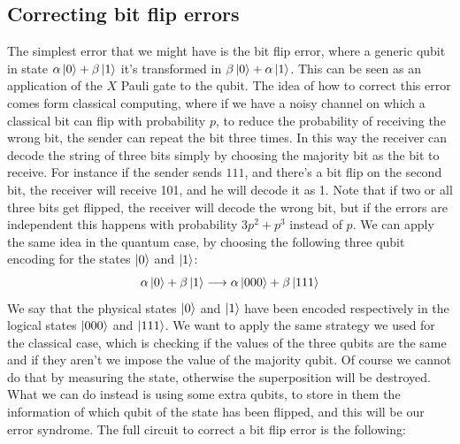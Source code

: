 \documentclass{article}
\begin{document}
	\subsection{Correcting bit flip errors}
	The simplest error that we might have is the bit flip error, where a generic qubit in state $\alpha\ket{0} + \beta\ket{1}$ it's transformed in $\beta\ket{0} + \alpha\ket{1}$. This can be seen as an application of the $X$ Pauli gate to the qubit. The idea of how to correct this error comes form classical computing, where if we have a noisy channel on which a classical bit can flip with probability $p$, to reduce the probability of receiving the wrong bit, the sender can repeat the bit three times. In this way the receiver can decode the string of three bits simply by choosing the majority bit as the bit to receive. For instance if the sender sends $111$, and there's a bit flip on the second bit, the receiver will receive 101, and he will decode it as 1. Note that if two or all three bits get flipped, the receiver will decode the wrong bit, but if the errors are independent this happens with probability $3p^2 + p^3$ instead of $p$. We can apply the same idea in the quantum case, by choosing the following three qubit encoding for the states $\ket{0}$ and $\ket{1}$:
	\[ \alpha\ket{0} + \beta\ket{1} \longrightarrow \alpha\ket{000} + \beta\ket{111}\]
	We say that the physical states $\ket{0}$ and $\ket{1}$ have been encoded respectively in the logical states $\ket{000}$ and $\ket{111}$. We want to apply the same strategy we used for the classical case, which is checking if the values of the three qubits are the same and if they aren't we impose the value of the majority qubit. Of course we cannot do that by measuring the state, otherwise the superposition will be destroyed. What we can do instead is using some extra qubits, to store in them the information of which qubit of the state has been flipped, and this will be our error syndrome. The full circuit to correct a bit flip error is the following:
\end{document}
